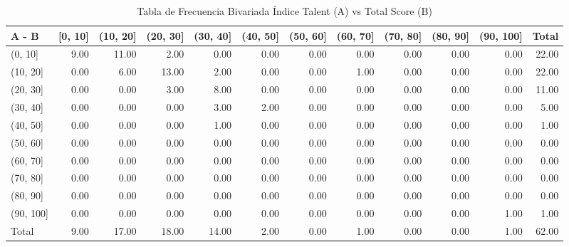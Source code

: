\documentclass[
]{article}
\begin{document}
\renewcommand{\arraystretch}{1.3}
\begin{scriptsize}%
\begin{longtable}{lrrrrrrrrrrr}
\caption{Tabla de Frecuencia Bivariada Índice Talent (A) vs Total Score (B)} \\ 
  \hline
A   -   B & [0, 10] & (10, 20] & (20, 30] & (30, 40] & (40, 50] & (50, 60] & (60, 70] & (70, 80] & (80, 90] & (90, 100] & Total \\ 
  \hline
(0, 10] & 9.00 & 11.00 & 2.00 & 0.00 & 0.00 & 0.00 & 0.00 & 0.00 & 0.00 & 0.00 & 22.00 \\ 
  (10, 20] & 0.00 & 6.00 & 13.00 & 2.00 & 0.00 & 0.00 & 1.00 & 0.00 & 0.00 & 0.00 & 22.00 \\ 
  (20, 30] & 0.00 & 0.00 & 3.00 & 8.00 & 0.00 & 0.00 & 0.00 & 0.00 & 0.00 & 0.00 & 11.00 \\ 
  (30, 40] & 0.00 & 0.00 & 0.00 & 3.00 & 2.00 & 0.00 & 0.00 & 0.00 & 0.00 & 0.00 & 5.00 \\ 
  (40, 50] & 0.00 & 0.00 & 0.00 & 1.00 & 0.00 & 0.00 & 0.00 & 0.00 & 0.00 & 0.00 & 1.00 \\ 
  (50, 60] & 0.00 & 0.00 & 0.00 & 0.00 & 0.00 & 0.00 & 0.00 & 0.00 & 0.00 & 0.00 & 0.00 \\ 
  (60, 70] & 0.00 & 0.00 & 0.00 & 0.00 & 0.00 & 0.00 & 0.00 & 0.00 & 0.00 & 0.00 & 0.00 \\ 
  (70, 80] & 0.00 & 0.00 & 0.00 & 0.00 & 0.00 & 0.00 & 0.00 & 0.00 & 0.00 & 0.00 & 0.00 \\ 
  (80, 90] & 0.00 & 0.00 & 0.00 & 0.00 & 0.00 & 0.00 & 0.00 & 0.00 & 0.00 & 0.00 & 0.00 \\ 
  (90, 100] & 0.00 & 0.00 & 0.00 & 0.00 & 0.00 & 0.00 & 0.00 & 0.00 & 0.00 & 1.00 & 1.00 \\ 
  Total & 9.00 & 17.00 & 18.00 & 14.00 & 2.00 & 0.00 & 1.00 & 0.00 & 0.00 & 1.00 & 62.00 \\ 
   \hline
\hline
\end{longtable}
\end{scriptsize}\renewcommand{\arraystretch}{1}
\end{document}
